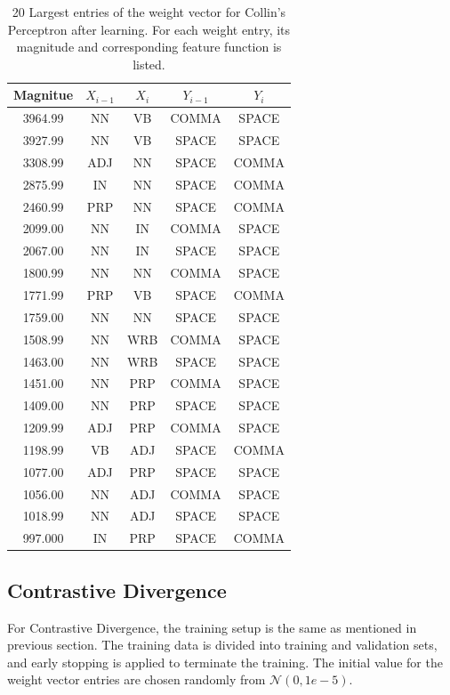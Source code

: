 \documentclass[twoside,12pt]{article}
\begin{document}
\begin{table}[H]\footnotesize
  \caption{20 Largest entries of the weight vector  for Collin's Perceptron after learning. For each weight entry, its magnitude and corresponding feature function is listed.}
\begin{center}
    \begin{tabular}{| c | c | c | c | c |}
    \hline
    \textbf{ Magnitue} & $X_{i-1}$ & $X_i$ & $Y_{i-1}$& $Y_i$ \\ \hline
3964.99 & NN & VB & COMMA & SPACE  \\ \hline
3927.99 & NN & VB & SPACE & SPACE  \\ \hline
3308.99 & ADJ & NN & SPACE & COMMA  \\ \hline
2875.99 & IN & NN & SPACE & COMMA  \\ \hline
2460.99 & PRP & NN & SPACE & COMMA  \\ \hline
2099.00 & NN & IN  & COMMA & SPACE  \\ \hline
2067.00 & NN & IN & SPACE & SPACE  \\ \hline
1800.99 & NN & NN & COMMA & SPACE  \\ \hline
1771.99 & PRP & VB & SPACE & COMMA  \\ \hline
1759.00 & NN & NN & SPACE & SPACE  \\ \hline
1508.99 & NN & WRB & COMMA & SPACE  \\ \hline
1463.00 & NN & WRB & SPACE & SPACE  \\ \hline
1451.00 & NN & PRP & COMMA & SPACE  \\ \hline
1409.00 & NN & PRP & SPACE & SPACE  \\ \hline
1209.99 & ADJ & PRP & COMMA & SPACE  \\ \hline
1198.99 & VB & ADJ & SPACE & COMMA  \\ \hline
1077.00 & ADJ & PRP & SPACE & SPACE  \\ \hline
1056.00 & NN & ADJ & COMMA & SPACE  \\ \hline
1018.99 & NN & ADJ & SPACE & SPACE  \\ \hline
997.000 & IN & PRP & SPACE & COMMA  \\ \hline
    \end{tabular}
    \label{tablePerceptronWeights}
\end{center}
\end{table}

\subsection{Contrastive Divergence}
For Contrastive Divergence, the training setup is the same as mentioned in previous section. The training data is divided into training and validation sets, and early stopping is applied to terminate the training. The initial value for the weight vector entries are chosen randomly from $\mathcal{N}(0,1e-5)$. 
\end{document}
